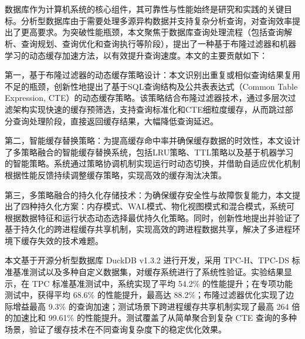 \chapter*{\xiaosan{}}

数据库作为计算机系统的核心组件，其可靠性与性能始终是研究和实践的关键目标。分析型数据库由于需要处理多源异构数据并支持复杂分析查询，对查询效率提出了更高要求。为突破性能瓶颈，本文聚焦于数据库查询处理流程（包括查询解析、查询规划、查询优化和查询执行等阶段），提出了一种基于布隆过滤器和机器学习的动态缓存加速方法，以有效提升查询速度。本文的主要贡献如下：

第一，基于布隆过滤器的动态缓存策略设计：本文识别出重复或相似查询结果复用不足的瓶颈，创新性地提出了基于SQL查询结构及公共表表达式（Common Table Expression, CTE）的动态缓存策略。该策略结合布隆过滤器技术，通过多层次过滤架构实现快速的缓存预筛选，支持查询标准化和CTE细粒度缓存，从而跳过部分查询处理阶段，直接返回缓存结果，大幅降低查询延迟。

第二，智能缓存替换策略：为提高缓存命中率并确保缓存数据的时效性，本文设计了多策略融合的智能缓存替换系统，包括LRU策略、TTL策略以及基于机器学习的智能策略。系统通过策略协调机制实现运行时动态切换，并借助自适应优化机制根据性能反馈持续调整缓存策略，实现高效的缓存淘汰决策。

第三，多策略融合的持久化存储技术：为确保缓存安全性与故障恢复能力，本文提出了四种持久化方案：内存模式、WAL模式、物化视图模式和混合模式，系统可根据数据特征和运行状态动态选择最优持久化策略。同时，创新性地提出并验证了基于持久化的跨进程缓存共享机制，实现高效的跨进程数据共享，解决了多进程环境下缓存失效的技术难题。

本文基于开源分析型数据库 DuckDB v1.3.2 进行开发，采用 TPC-H、TPC-DS 标准基准测试以及多种自定义数据集，对缓存系统进行了系统性验证。实验结果显示，在 TPC 标准基准测试中，系统实现了平均 54.2\% 的性能提升；在专项功能测试中，获得平均 68.6\% 的性能提升，最高达 88.2\%；布隆过滤器优化实现了边际增益最高 9.3\% 的查询加速；测试场景下跨进程缓存共享机制实现了最高 264 倍的加速比和 99.61\% 的性能提升。测试覆盖了从简单聚合到复杂 CTE 查询的多种场景，验证了缓存技术在不同查询复杂度下的稳定优化效果。

\vspace{0.5cm}
